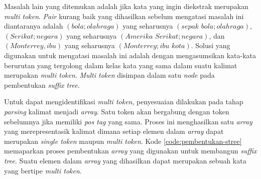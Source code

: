 Masalah lain yang ditemukan adalah jika kata yang ingin diekstrak merupakan \textit{multi token}. \textit{Pair} kurang baik yang dihasilkan sebelum mengatasi masalah ini diantaranya adalah $(bola;olahraga)$ yang seharusnya $(sepak\,\,bola;olahraga)$, $(Serikat;negara)$ yang seharusnya $(Amerika\,\,Serikat;negara)$, dan $(Monterrey,ibu)$ yang seharusnya $(Monterrey;ibu\,\,kota)$. Solusi yang digunakan untuk mengatasi masalah ini adalah dengan mengasumsikan kata-kata berurutan yang tergolong dalam kelas kata yang sama dalam suatu kalimat merupakan \textit{multi token}. \textit{Multi token} disimpan dalam satu \textit{node} pada pembentukan \textit{suffix tree}.

Untuk dapat mengidentifikasi \textit{multi token}, penyesuaian dilakukan pada tahap \textit{parsing} kalimat menjadi \textit{array}. Satu token akan bergabung dengan token sebelumnya jika memiliki \textit{pos tag} yang sama. Proses ini menghasilkan satu \textit{array} yang merepresentasik kalimat dimana setiap elemen dalam \textit{array} dapat merupakan \textit{single token} maupun \textit{multi token}. Kode \ref{code:pembentukan-stree} memaparkan proses pembentukan \textit{array} yang digunakan untuk membangun \textit{suffix tree}. Suatu elemen dalam \textit{array} yang dihasilkan dapat merupakan sebuah kata yang bertipe \textit{multi token}.

